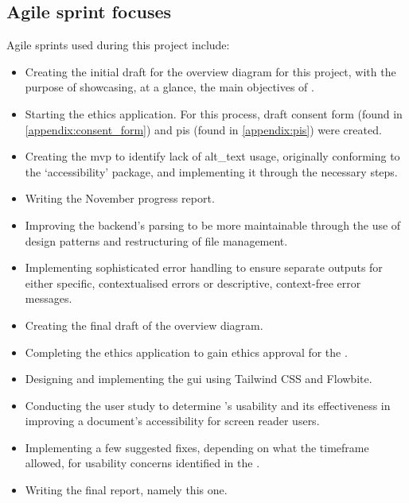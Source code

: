 \subsection{Agile sprint focuses}\label{appendix:sprints_list}
Agile sprints used during this project include:
\begin{itemize}
    \item Creating the initial draft for the overview diagram for this project, with the purpose of showcasing, at a glance, the main objectives of \lintex .
    \item Starting the ethics application. For this process, draft consent form (found in \cref{appendix:consent_form}) and \acrfull{pis} (found in \cref{appendix:pis}) were created.
    \item Creating the \acrfull{mvp} to identify lack of \gls{alt_text} usage, originally conforming to the `accessibility' package, and implementing it through the necessary steps.
    \item Writing the November progress report.
    \item Improving the backend's parsing to be more maintainable through the use of design patterns and restructuring of file management.
    \item Implementing sophisticated error handling to ensure separate outputs for either specific, contextualised errors or descriptive, context-free error messages.
    \item Creating the final draft of the overview diagram.
    \item Completing the ethics application to gain ethics approval for the .
    \item Designing and implementing the \acrfull{gui} using Tailwind CSS and Flowbite.
    \item Conducting the user study to determine \lintex 's usability and its effectiveness in improving a \latexspaced document's accessibility for screen reader users.
    \item Implementing a few suggested fixes, depending on what the timeframe allowed, for usability concerns identified in the .
    \item Writing the final report, namely this one.
\end{itemize}
\clearpage

